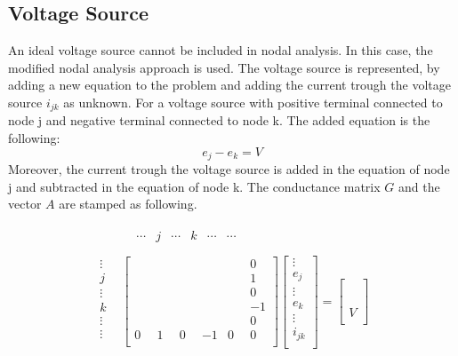 \subsection{Voltage Source}
An ideal voltage source cannot be included in nodal analysis. In this case, the modified nodal analysis approach is used. The voltage source is represented, by adding a new equation to the problem and adding the current trough the voltage source $i_{jk}$ as unknown. 
For a voltage source with positive terminal connected to node j and negative terminal connected to node k. The added equation is the following:
\begin{equation}
e_j - e_k = V
\end{equation}
Moreover, the current trough the voltage source is added in the equation of node j and subtracted in the equation of node k.
The conductance matrix $G$ and the vector $A$ are stamped as following.

\begin{align}
	& \begin{matrix}
	& \cdots & j & \cdots & k & \cdots & \cdots\\[-6pt]
	\end{matrix}\\
	\begin{matrix}
	\vdots\\
	j\\
	\vdots\\
	k\\
	\vdots\\
	\vdots\\
	\end{matrix}
	& \begin{bmatrix}
	\quad & \quad & \quad & \quad & \quad & 0\\[6pt]
	& & & & & 1\\[6pt]
	& & & & & 0\\[6pt]
	& & & & & -1\\[6pt]
	& & & & & 0\\[6pt]
	0 & 1 & 0 & -1 & 0 & 0\\
	\end{bmatrix}
	\begin{bmatrix}
	\vdots \\
	e_j\\[6pt]
	\vdots \\
	e_k\\[6pt]
	\vdots\\
	i_{jk}\\
	\end{bmatrix}
	=
	\begin{bmatrix}
	\\[6pt]
	\\[6pt]
	\\[6pt]
	\\[6pt]
	\\[6pt]
	V\\
	\end{bmatrix}	
\end{align}

